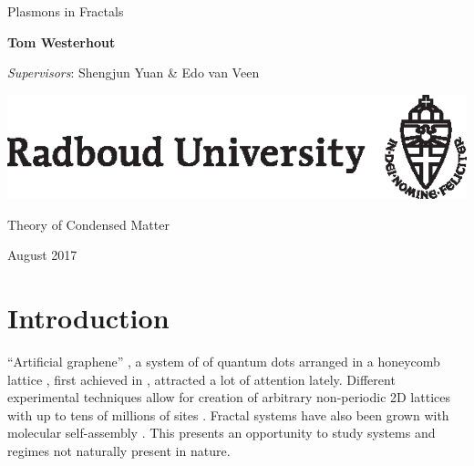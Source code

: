\documentclass[a4paper,12pt]{article}
\begin{document}
\begin{titlepage}
    \begin{center}
        \vspace*{3cm}
   
        {\ttfamily\LARGE Plasmons in Fractals\par}
        
        \vspace{1.5cm}
        
        {\ttfamily\large\textbf{Tom Westerhout} \par}
        
        \vspace{0.5cm}

        {\ttfamily\textit{Supervisors}: Shengjun Yuan \& Edo van Veen}
        
        \vfill
        
        
        \hbox{\hspace{5.6cm}\includegraphics{ru_e_a4_zwart_2014.eps}}
        
        {\ttfamily Theory of Condensed Matter \par}
        { August 2017}

        \vspace{2cm}
        
    \end{center}
\end{titlepage}

\begin{center}
    
\end{center}

\tableofcontents

\newpage

\section{Introduction}
    ``Artificial graphene'' , a system of of quantum dots  arranged in a honeycomb lattice , first achieved in \cite{engineering2009}, attracted a lot of attention lately. Different experimental techniques \cite{artificial2013} allow for creation of arbitrary non-periodic 2D lattices  with up to tens of millions of sites . Fractal systems have also been grown with molecular self-assembly \cite{newkome2006nanoassembly}. This presents an opportunity to study systems and regimes not naturally present in nature.
    
\end{document}
